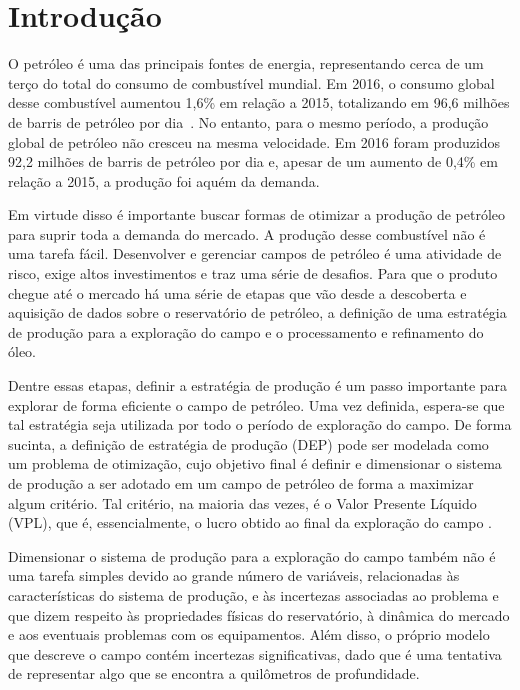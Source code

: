 
\chapter{Introdução}
\label{ch:1_Introducao}
O petróleo é uma das principais fontes de energia, representando cerca de um terço do total do consumo de combustível mundial. Em 2016, o consumo global desse combustível aumentou 1,6\% em relação a 2015, totalizando em 96,6 milhões de barris de petróleo por dia~\cite{BritishPetroleum2017, ANP2017}. No entanto, para o mesmo período, a produção global de petróleo não cresceu na mesma velocidade. Em 2016 foram produzidos 92,2 milhões de barris de petróleo por dia e, apesar de um aumento de 0,4\% em relação a 2015, a produção foi aquém da demanda.

Em virtude disso é importante buscar formas de otimizar a produção de petróleo para suprir toda a demanda do mercado. A produção desse combustível não é uma tarefa fácil. Desenvolver e gerenciar campos de petróleo é uma atividade de risco, exige altos investimentos e traz uma série de desafios. Para que o produto chegue até o mercado há uma série de etapas que vão desde a descoberta e aquisição de dados sobre o reservatório de petróleo, a definição de uma estratégia de produção para a exploração do campo e o processamento e refinamento do óleo\cite{ANP2017}.

Dentre essas etapas, definir a estratégia de produção é um passo importante para explorar de forma eficiente o campo de petróleo. Uma vez definida, espera-se que tal estratégia seja utilizada por todo o período de exploração do campo. De forma sucinta, a definição de estratégia de produção (DEP) pode ser modelada como um problema de otimização, cujo objetivo final é definir e dimensionar o sistema de produção a ser adotado em um campo de petróleo de forma a maximizar algum critério. Tal critério, na maioria das vezes, é o Valor Presente Líquido (VPL), que é, essencialmente, o lucro obtido ao final da exploração do campo \cite{Marques2012}.

Dimensionar o sistema de produção para a exploração do campo também não é uma tarefa simples devido ao grande número de variáveis, relacionadas às características do sistema de produção, e às incertezas associadas ao problema e que dizem respeito às propriedades físicas do reservatório, à dinâmica do mercado e aos eventuais problemas com os equipamentos. Além disso, o próprio modelo que descreve o campo contém incertezas significativas, dado que é uma tentativa de representar algo que se encontra a quilômetros de profundidade.


